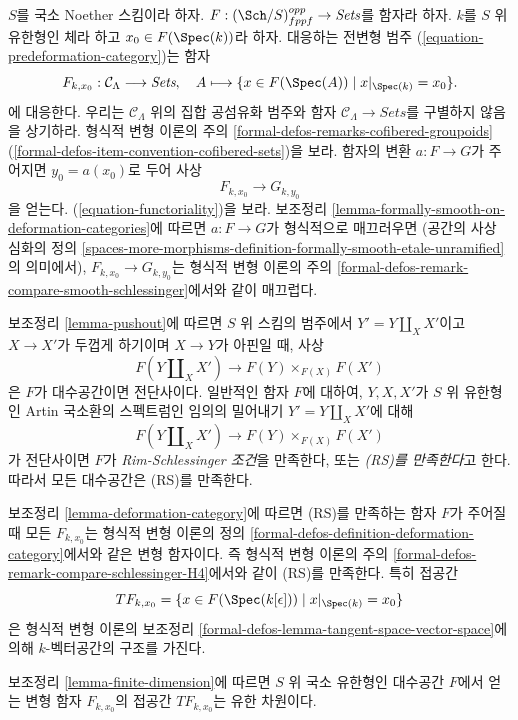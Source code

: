 \medskip\noindent
$S$를 국소 Noether 스킴이라 하자.
$F : (\Sch/S)_{fppf}^{opp} \to \textit{Sets}$를 함자라 하자.
$k$를 $S$ 위 유한형인 체라 하고 $x_0 \in F(\Spec(k))$라 하자.
대응하는 전변형 범주 (\ref{equation-predeformation-category})는 함자
$$
F_{k, x_0} : \mathcal{C}_\Lambda \longrightarrow \textit{Sets},
\quad
A \longmapsto \{x \in F(\Spec(A)) \mid x|_{\Spec(k)} = x_0 \}.
$$
에 대응한다.
우리는 $\mathcal{C}_\Lambda$ 위의 집합 공섬유화 범주와
함자 $\mathcal{C}_\Lambda \to \textit{Sets}$를 구별하지 않음을 상기하라.
형식적 변형 이론의 주의
\ref{formal-defos-remarks-cofibered-groupoids}
(\ref{formal-defos-item-convention-cofibered-sets})을 보라.
함자의 변환 $a : F \to G$가 주어지면 $y_0 = a(x_0)$로 두어 사상
$$
F_{k, x_0} \longrightarrow G_{k, y_0}
$$
을 얻는다. (\ref{equation-functoriality})을 보라.
보조정리 \ref{lemma-formally-smooth-on-deformation-categories}에 따르면
$a : F \to G$가 형식적으로 매끄러우면 (공간의 사상 심화의
정의 \ref{spaces-more-morphisms-definition-formally-smooth-etale-unramified}의
의미에서), $F_{k, x_0} \longrightarrow G_{k, y_0}$는 형식적 변형 이론의
주의 \ref{formal-defos-remark-compare-smooth-schlessinger}에서와 같이
매끄럽다.

\medskip\noindent
보조정리 \ref{lemma-pushout}에 따르면 $S$ 위 스킴의 범주에서
$Y' = Y \amalg_X X'$이고 $X \to X'$가 두껍게 하기이며
$X \to Y$가 아핀일 때, 사상
$$
F(Y \amalg_X X') \to F(Y) \times_{F(X)} F(X')
$$
은 $F$가 대수공간이면 전단사이다.
일반적인 함자 $F$에 대하여, $Y, X, X'$가 $S$ 위 유한형인 Artin
국소환의 스펙트럼인 임의의 밀어내기 $Y' = Y \amalg_X X'$에 대해
$$
F(Y \amalg_X X') \to F(Y) \times_{F(X)} F(X')
$$
가 전단사이면 $F$가 {\it Rim-Schlessinger 조건}을 만족한다,
또는 {\it (RS)를 만족한다}고 한다. 따라서 모든 대수공간은 (RS)를 만족한다.

\medskip\noindent
보조정리 \ref{lemma-deformation-category}에 따르면 (RS)를 만족하는
함자 $F$가 주어질 때 모든 $F_{k, x_0}$는 형식적 변형 이론의
정의 \ref{formal-defos-definition-deformation-category}에서와 같은
변형 함자이다. 즉 형식적 변형 이론의
주의 \ref{formal-defos-remark-compare-schlessinger-H4}에서와 같이
(RS)를 만족한다. 특히 접공간
$$
TF_{k, x_0} = \{x \in F(\Spec(k[\epsilon])) \mid x|_{\Spec(k)} = x_0\}
$$
은 형식적 변형 이론의 보조정리
\ref{formal-defos-lemma-tangent-space-vector-space}에 의해
$k$-벡터공간의 구조를 가진다.

\medskip\noindent
보조정리 \ref{lemma-finite-dimension}에 따르면 $S$ 위 국소 유한형인
대수공간 $F$에서 얻는 변형 함자 $F_{k, x_0}$의 접공간 $TF_{k, x_0}$는
유한 차원이다.

